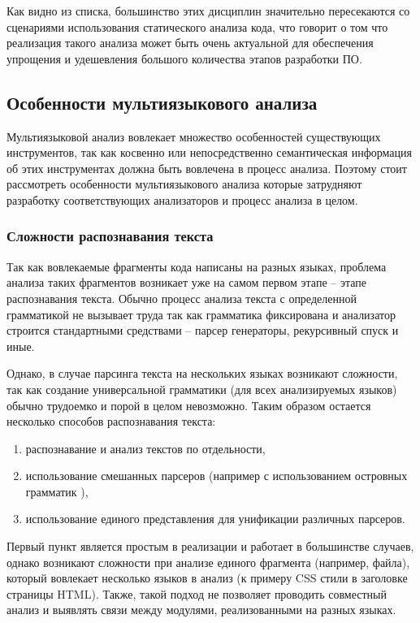 Как видно из списка, большинство этих дисциплин значительно пересекаются со сценариями использования
статического анализа кода, что говорит о том что реализация такого анализа может быть очень актуальной
для обеспечения упрощения и удешевления большого количества этапов разработки ПО.

\subsection{Особенности мультиязыкового анализа} \label{ssec:num1}

Мультиязыковой анализ вовлекает множество особенностей существующих инструментов, так как косвенно или
непосредственно семантическая информация об этих инструментах должна быть вовлечена в процесс анализа.
Поэтому стоит рассмотреть особенности мультиязыкового анализа которые затрудняют разработку соответствующих
анализаторов и процесс анализа в целом.

\subsubsection{Сложности распознавания текста} \label{ssec:parsing-problem}

Так как вовлекаемые фрагменты кода написаны на разных языках, проблема анализа таких фрагментов
возникает уже на самом первом этапе -- этапе распознавания текста. Обычно процесс анализа
текста с определенной грамматикой не вызывает труда так как грамматика фиксирована и анализатор строится
стандартными средствами -- парсер генераторы, рекурсивный спуск и иные. 

Однако, в случае парсинга текста на нескольких языках возникают сложности, так как создание универсальной
грамматики (для всех анализируемых языков) обычно трудоемко и порой в целом невозможно. Таким образом остается
несколько способов распознавания текста:
\begin{enumerate}[label=\arabic*.]
    \item распознавание и анализ текстов по отдельности,
    \item использование смешанных парсеров (например с использованием островных грамматик \cite{island-grammars}),
    \item использование единого представления для унификации различных парсеров.
\end{enumerate}

Первый пункт является простым в реализации и работает в большинстве случаев, однако
возникают сложности при анализе единого фрагмента (например, файла), который вовлекает несколько
языков в анализ (к примеру CSS стили в заголовке страницы HTML). Также, такой подход не позволяет
проводить совместный анализ и выявлять связи между модулями, реализованными на разных языках.

